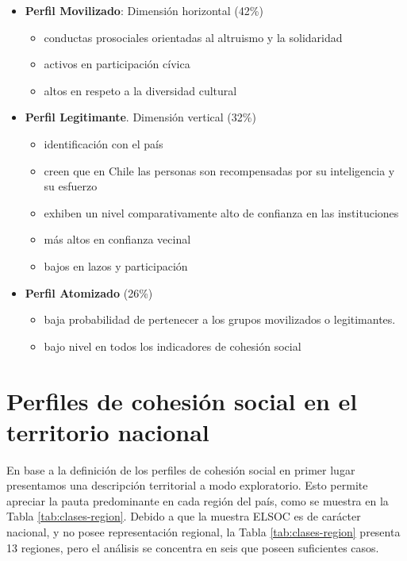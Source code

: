 \documentclass[
  12pt,
]{book}
\providecommand{\tightlist}{%
  \setlength{\itemsep}{0pt}\setlength{\parskip}{0pt}}
\begin{document}
\begin{itemize}
\tightlist
\item
  \textbf{Perfil Movilizado}: Dimensión horizontal (42\%)

  \begin{itemize}
  \tightlist
  \item
    conductas prosociales orientadas al altruismo y la solidaridad
  \item
    activos en participación cívica
  \item
    altos en respeto a la diversidad cultural
  \end{itemize}
\item
  \textbf{Perfil Legitimante}. Dimensión vertical (32\%)

  \begin{itemize}
  \tightlist
  \item
    identificación con el país
  \item
    creen que en Chile las personas son recompensadas por su inteligencia y su esfuerzo
  \item
    exhiben un nivel comparativamente alto de confianza en las instituciones
  \item
    más altos en confianza vecinal
  \item
    bajos en lazos y participación
  \end{itemize}
\item
  \textbf{Perfil Atomizado} (26\%)

  \begin{itemize}
  \tightlist
  \item
    baja probabilidad de pertenecer a los grupos movilizados o legitimantes.
  \item
    bajo nivel en todos los indicadores de cohesión social
  \end{itemize}
\end{itemize}

\hypertarget{perfiles-de-cohesiuxf3n-social-en-el-territorio-nacional}{%
\section{Perfiles de cohesión social en el territorio nacional}\label{perfiles-de-cohesiuxf3n-social-en-el-territorio-nacional}}

En base a la definición de los perfiles de cohesión social en primer lugar presentamos una descripción territorial a modo exploratorio. Esto permite apreciar la pauta predominante en cada región del país, como se muestra en la Tabla \ref{tab:clases-region}. Debido a que la muestra ELSOC es de carácter nacional, y no posee representación regional, la Tabla \ref{tab:clases-region} presenta 13 regiones, pero el análisis se concentra en seis que poseen suficientes casos.
\end{document}

